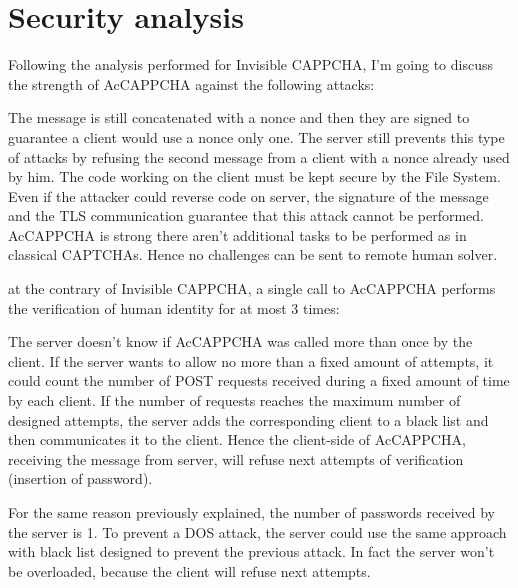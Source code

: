 \section{Security analysis}\label{Results:security}
Following the analysis performed for Invisible CAPPCHA\cite{Invisible_CAPPCHA}, I'm going to discuss the strength of AcCAPPCHA against the following attacks:
\begin{itemize}
{The message is still concatenated with a nonce and then they are signed to guarantee a client would use a nonce only one. The server still prevents this type of attacks by refusing the second message from a client with a nonce already used by him.}
{The code working on the client must be kept secure by the File System. Even if the attacker could reverse code on server, the signature of the message and the TLS communication guarantee that this attack cannot be performed.}
{AcCAPPCHA is strong there aren't additional tasks to be performed as in classical CAPTCHAs. Hence no challenges can be sent to remote human solver.}
{at the contrary of Invisible CAPPCHA, a single call to AcCAPPCHA performs the verification of human identity for at most 3 times:
\begin{itemize}
\end{itemize}
The server doesn't know if AcCAPPCHA was called more than once by the client. If the server wants to allow no more than a fixed amount of attempts, it could count the number of POST requests received during a fixed amount of time by each client. If the number of requests reaches the maximum number of designed attempts, the server adds the corresponding client to a black list and then communicates it to the client. Hence the client-side of AcCAPPCHA, receiving the message from server, will refuse next attempts of verification (insertion of password).
}
{For the same reason previously explained, the number of passwords received by the server is 1. To prevent a DOS attack, the server could use the same approach with black list designed to prevent the previous attack. In fact the server won't be overloaded, because the client will refuse next attempts.}
\end{itemize}
